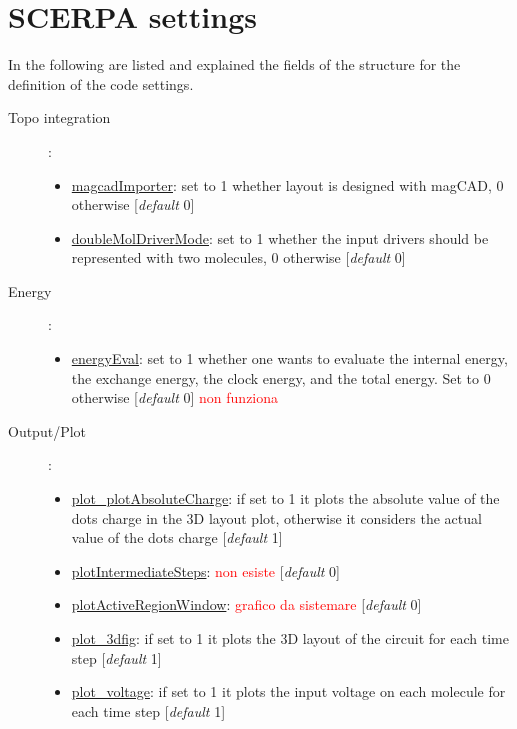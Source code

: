 \documentclass[a4paper,10pt]{article}
\begin{document}
\section{SCERPA settings}
\noindent In the following are listed and explained the fields of the structure for the definition of the code settings.

\begin{description}
\item[Topo integration]:
	\begin{itemize}
	\item \underline{magcadImporter}: set to 1 whether layout is designed with magCAD, 0 otherwise [\textit{default} 0]
	\item \underline{doubleMolDriverMode}: set to 1 whether the input drivers should be represented with two molecules, 0 otherwise [\textit{default} 0]
	\end{itemize}
\item[Energy]:
	\begin{itemize}
	\item \underline{energyEval}: set to 1 whether one wants to evaluate the internal energy, the exchange energy, the clock energy, and the total energy. Set to 0 otherwise [\textit{default} 0] \textcolor{red}{non funziona}
	\end{itemize}
\item[Output/Plot]:
	\begin{itemize}
	\item \underline{plot\_plotAbsoluteCharge}: if set to 1 it plots the absolute value of the dots charge in the 3D layout plot, otherwise it considers the actual value of the dots charge [\textit{default} 1] 
	\item \underline{plotIntermediateSteps}: \textcolor{red}{non esiste} [\textit{default} 0] 
	\item \underline{plotActiveRegionWindow}: \textcolor{red}{grafico da sistemare} [\textit{default} 0] 
	\item \underline{plot\_3dfig}: if set to 1 it plots the 3D layout of the circuit for each time step [\textit{default} 1] 
	\item \underline{plot\_voltage}: if set to 1 it plots the input voltage on each molecule for each time step [\textit{default} 1] 

\end{itemize}
\end{description}
\end{document}
